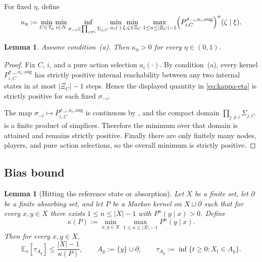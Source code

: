 \documentclass[12pt]{article}
\newtheorem{lemma}[theorem]{Lemma}
\theoremstyle{definition}
\newcommand{\E}{\mathbb{E}}
\newcommand{\1}{\mathbf{1}}
\newcommand{\cT}{\mathcal{T}}
\begin{document}
For fixed $\eta$, define
\begin{equation}
\label{eq:kappa-eta}
\kappa_\eta
:=
\min_{C\in\cT_\eta}
\min_{i\in N}
\inf_{\sigma_{-i}\in\prod_{j\ne i}\Sigma_{j,C}}
\min_{a_i(\cdot)}
\min_{\xi,\zeta\in\Xi_C}
\max_{1\le n\le |\Xi_C|-1}
\Bigl(P_{i,C}^{\sigma_{-i},a_i,\mathrm{aug}}\Bigr)^n(\zeta\mid\xi).
\end{equation}

\begin{lemma}
\label{lem:kappa-positive}
Assume condition~\textnormal{(a)}. Then $\kappa_\eta>0$ for every $\eta\in(0,1)$.
\end{lemma}

\begin{proof}
Fix $C$, $i$, and a pure action selection $a_i(\cdot)$. By
condition~\textnormal{(a)}, every kernel
$P_{i,C}^{\sigma_{-i},a_i,\mathrm{aug}}$ has strictly positive internal
reachability between any two internal states in at most $|\Xi_C|-1$ steps. Hence
the displayed quantity in \eqref{eq:kappa-eta} is strictly positive for each fixed
$\sigma_{-i}$.

The map
$\sigma_{-i}\mapsto P_{i,C}^{\sigma_{-i},a_i,\mathrm{aug}}$ is continuous by
, and the compact domain
$\prod_{j\ne i}\Sigma_{j,C}$ is a finite product of simplices. Therefore the
minimum over that domain is attained and remains strictly positive. Finally there
are only finitely many nodes, players, and pure action selections, so the overall
minimum is strictly positive.
\end{proof}

\subsection{Bias bound}


\begin{lemma}[Hitting the reference state or absorption]
\label{lem:hitting-time}
Let $X$ be a finite set, let $\partial$ be a finite absorbing set, and let $P$ be a
Markov kernel on $X\sqcup\partial$ such that for every $x,y\in X$ there exists
$1\le n\le |X|-1$ with $P^n(y\mid x)>0$. Define
\[
\kappa(P):=\min_{x,y\in X}\max_{1\le n\le |X|-1}P^n(y\mid x).
\]
Then for every $x,y\in X$,
\[
\E_x[\tau_{A_y}]\le \frac{|X|-1}{\kappa(P)},
\qquad
A_y:=\{y\}\cup \partial,
\qquad
\tau_{A_y}:=\inf\{t\ge 0:X_t\in A_y\}.
\]
\end{lemma}
\end{document}
